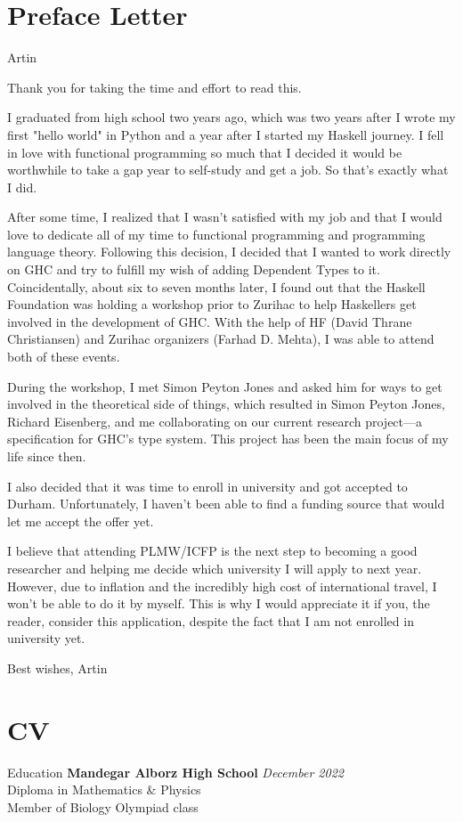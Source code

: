 \documentclass[
	a4paper,
	11pt,
]{resume}
\begin{document}
\section{Preface Letter}
Artin

Thank you for taking the time and effort to read this.

I graduated from high school two years ago, which was two years after
I wrote my first "hello world" in Python and a year after I started my
Haskell journey. I fell in love with functional programming so much
that I decided it would be worthwhile to take a gap year to self-study
and get a job. So that's exactly what I did.

After some time, I realized that I wasn't satisfied with my job and
that I would love to dedicate all of my time to functional programming
and programming language theory. Following this decision, I decided
that I wanted to work directly on GHC and try to fulfill my wish of
adding Dependent Types to it. Coincidentally, about six to seven
months later, I found out that the Haskell Foundation was holding a
workshop prior to Zurihac to help Haskellers get involved in the
development of GHC. With the help of HF (David Thrane Christiansen)
and Zurihac organizers (Farhad D. Mehta), I was able to attend both of
these events.

During the workshop, I met Simon Peyton Jones and asked him for ways
to get involved in the theoretical side of things, which resulted in
Simon Peyton Jones, Richard Eisenberg, and me collaborating on our
current research project—a specification for GHC's type system. This
project has been the main focus of my life since then.

I also decided that it was time to enroll in university and got
accepted to Durham. Unfortunately, I haven't been able to find a
funding source that would let me accept the offer yet.

I believe that attending PLMW/ICFP is the next step to becoming a good
researcher and helping me decide which university I will apply to next
year. However, due to inflation and the incredibly high cost of
international travel, I won't be able to do it by myself. This is why
I would appreciate it if you, the reader, consider this application,
despite the fact that I am not enrolled in university yet.

Best wishes,
Artin

\newpage

\section{CV}
\begin{rSection}{Education}
	\textbf{Mandegar Alborz High School} \hfill \textit{December 2022} \\
	Diploma in Mathematics \& Physics \\
    Member of Biology Olympiad class \\
\end{rSection}
\end{document}
